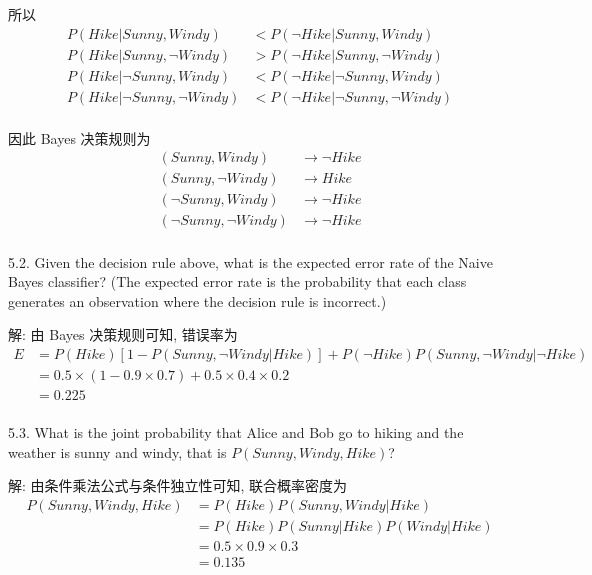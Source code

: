 \documentclass{article}
\begin{document}
所以
\begin{equation}
  \begin{aligned}
    P(Hike|Sunny,Windy)&<P(\neg Hike|Sunny,Windy)\\
    P(Hike|Sunny,\neg Windy)&>P(\neg Hike|Sunny,\neg Windy)\\
    P(Hike|\neg Sunny,Windy)&<P(\neg Hike|\neg Sunny,Windy)\\
    P(Hike|\neg Sunny,\neg Windy)&<P(\neg Hike|\neg Sunny,\neg Windy)\\
  \end{aligned}
\end{equation}

因此 Bayes 决策规则为
\begin{equation}
  \begin{aligned}
    (Sunny,Windy)&\to\neg Hike\\
    (Sunny,\neg Windy)&\to Hike\\
    (\neg Sunny,Windy)&\to\neg Hike\\
    (\neg Sunny,\neg Windy)&\to\neg Hike\\
  \end{aligned}
\end{equation}

5.2. Given the decision rule above, what is the expected error rate of the Naive Bayes classifier? (The expected error rate is the probability that each class generates an observation where the decision rule is incorrect.)

解: 由 Bayes 决策规则可知, 错误率为
\begin{equation}
  \begin{aligned}
    E
    &=P(Hike)[1-P(Sunny,\neg Windy|Hike)]+P(\neg Hike)P(Sunny,\neg Windy|\neg Hike)\\
    &=0.5\times(1-0.9\times0.7)+0.5\times0.4\times0.2\\
    &=0.225\\
  \end{aligned}
\end{equation}

5.3. What is the joint probability that Alice and Bob go to hiking and the weather is sunny and windy, that is $P(Sunny,Windy,Hike)$?

解: 由条件乘法公式与条件独立性可知, 联合概率密度为
\begin{equation}
  \begin{aligned}
    P(Sunny,Windy,Hike)
    &=P(Hike)P(Sunny,Windy|Hike)\\
    &=P(Hike)P(Sunny|Hike)P(Windy|Hike)\\
    &=0.5 \times 0.9 \times 0.3\\
    &=0.135\\
  \end{aligned}
\end{equation}
\end{document}

